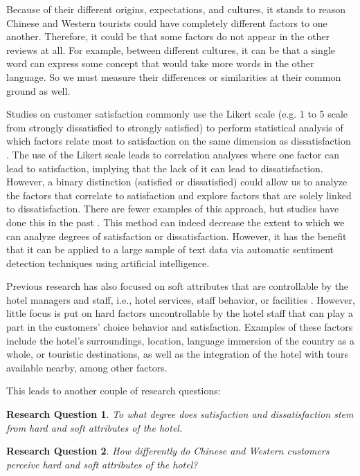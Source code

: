 \documentclass[smallextended,natbib]{svjour3}       %
\makeatletter
\newtheorem{rsq}{Research Question}
\newcounter{subrsq}
\newenvironment{subrsq}
         {%
          \setcounter{subrsq}{0}%
          \stepcounter{rsq}%
          \edef\saved@rsq{\thersq}%
          \let\c@rsq\c@subrsq     %
          \renewcommand{\thersq}{\saved@rsq\alph{rsq}}%
         }
         {}
\makeatother
\begin{document}
    Because of their different origins, expectations, and cultures, it stands to reason Chinese and Western tourists could have completely different factors to one another. Therefore, it could be that some factors do not appear in the other reviews at all. For example, between different cultures, it can be that a single word can express some concept that would take more words in the other language. So we must measure their differences or similarities at their common ground as well. 

    Studies on customer satisfaction \cite[e.g.][]{truong2009, romao2014, wu2009} commonly use the Likert scale \cite[][]{likert1932technique} (e.g. 1 to 5 scale from strongly dissatisfied to strongly satisfied) to perform statistical analysis of which factors relate most to satisfaction on the same dimension as dissatisfaction \cite[e.g.][]{chan201518, choi2000}. The use of the Likert scale leads to correlation analyses where one factor can lead to satisfaction, implying that the lack of it can lead to dissatisfaction. However, a binary distinction (satisfied or dissatisfied) could allow us to analyze the factors that correlate to satisfaction and explore factors that are solely linked to dissatisfaction. There are fewer examples of this approach, but studies have done this in the past \cite[e.g.][]{zhou2014}. This method can indeed decrease the extent to which we can analyze degrees of satisfaction or dissatisfaction. However, it has the benefit that it can be applied to a large sample of text data via automatic sentiment detection techniques using artificial intelligence. 

    Previous research has also focused on soft attributes that are controllable by the hotel managers and staff, i.e., hotel services, staff behavior, or facilities \cite[e.g.][]{shanka2004, choi2001}. However, little focus is put on hard factors uncontrollable by the hotel staff that can play a part in the customers' choice behavior and satisfaction. Examples of these factors include the hotel's surroundings, location, language immersion of the country as a whole, or touristic destinations, as well as the integration of the hotel with tours available nearby, among other factors. 

    This leads to another couple of research questions:

    \begin{subrsq}
    \begin{rsq}
    \label{rsq:hard_soft}
    To what degree does satisfaction and dissatisfaction stem from hard and soft attributes of the hotel.
    \end{rsq}

    \begin{rsq}
    \label{rsq:hard_soft_diff}
    How differently do Chinese and Western customers perceive hard and soft attributes of the hotel?
    \end{rsq}
    
    \end{subrsq}
\end{document}
